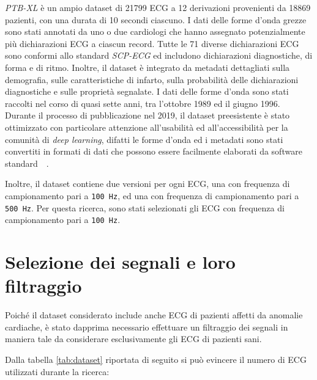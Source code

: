 \documentclass[12pt,italian]{report}
\begin{document}
	\textit{PTB-XL} è un ampio dataset di 21799 ECG a 12 derivazioni provenienti da 18869 pazienti, con una durata di 10 secondi ciascuno. I dati delle forme d'onda grezze sono stati annotati da uno o due cardiologi che hanno assegnato potenzialmente più dichiarazioni ECG a ciascun record. Tutte le 71 diverse dichiarazioni ECG sono conformi allo standard \textit{SCP-ECG} ed includono dichiarazioni diagnostiche, di forma e di ritmo. Inoltre, il dataset è integrato da metadati dettagliati sulla demografia, sulle caratteristiche di infarto, sulla probabilità delle dichiarazioni diagnostiche e sulle proprietà segnalate. I dati delle forme d'onda sono stati raccolti nel corso di quasi sette anni, tra l'ottobre 1989 ed il giugno 1996. Durante il processo di pubblicazione nel 2019, il dataset preesistente è stato ottimizzato con particolare attenzione all'usabilità ed all'accessibilità per la comunità di \textit{deep learning}, difatti le forme d'onda ed i metadati sono stati convertiti in formati di dati che possono essere facilmente elaborati da software standard~\cite{dataset}~\cite{datasetref}.
	
	Inoltre, il dataset contiene due versioni per ogni ECG, una con frequenza di campionamento pari a \texttt{100 Hz}, ed una con frequenza di campionamento pari a \texttt{500 Hz}. Per questa ricerca, sono stati selezionati gli ECG con frequenza di campionamento pari a \texttt{100 Hz}.
	
	
	\section{Selezione dei segnali e loro filtraggio}
	\label{sec:filtraggio}
	
	Poiché il dataset considerato include anche ECG di pazienti affetti da anomalie cardiache, è stato dapprima necessario effettuare un filtraggio dei segnali in maniera tale da considerare esclusivamente gli ECG di pazienti sani.
	
	Dalla tabella \ref{tab:dataset} riportata di seguito si può evincere il numero di ECG utilizzati durante la ricerca:
	
\end{document}
